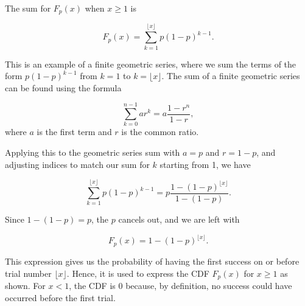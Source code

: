 \documentclass[12pt]{article}
\begin{document}
The sum for \( F_p(x) \) when \( x \geq 1 \) is

\[
F_p(x) = \sum_{k=1}^{\lfloor x \rfloor} p(1-p)^{k-1}.
\]

This is an example of a finite geometric series, where we sum the terms of the form \( p(1-p)^{k-1} \) from \( k=1 \) to \( k=\lfloor x \rfloor \). The sum of a finite geometric series can be found using the formula

\[
\sum_{k=0}^{n-1} ar^k = a \frac{1-r^n}{1-r},
\]
where \( a \) is the first term and \( r \) is the common ratio.

Applying this to the geometric series sum with \( a = p \) and \( r = 1 - p \), and adjusting indices to match our sum for \( k \) starting from 1, we have

\[
\sum_{k=1}^{\lfloor x \rfloor} p(1-p)^{k-1} = p \frac{1-(1-p)^{\lfloor x \rfloor}}{1-(1-p)}.
\]

Since \( 1 - (1 - p) = p \), the \( p \) cancels out, and we are left with

\[
F_p(x) = 1 - (1-p)^{\lfloor x \rfloor}.
\]

This expression gives us the probability of having the first success on or before trial number \( \lfloor x \rfloor \). Hence, it is used to express the CDF \( F_p(x) \) for \( x \geq 1 \) as shown. For \( x < 1 \), the CDF is 0 because, by definition, no success could have occurred before the first trial.
\end{document}
